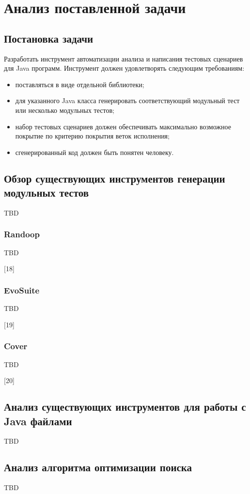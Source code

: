 \chapter{Анализ поставленной задачи} 

\section{Постановка задачи}

Разработать инструмент автоматизации анализа и написания тестовых сценариев для Java программ. Инструмент должен удовлетворять следующим требованиям:

\begin{itemize}
	\item поставляться в виде отдельной библиотеки;
	\item для указанного Java класса генерировать соответствующий модульный тест или несколько модульных тестов;
	\item набор тестовых сценариев должен обеспечивать максимально возможное покрытие по критерию покрытия веток исполнения;
	\item сгенерированный код должен быть понятен человеку.
\end{itemize}


\section{Обзор существующих инструментов генерации модульных тестов}

TBD

\subsection{Randoop}

TBD 

[18]

\subsection{EvoSuite}

TBD 

[19]

\subsection{Cover}

TBD

[20]


\section{Анализ существующих инструментов для работы с Java файлами}

TBD

\section{Анализ алгоритма оптимизации поиска}

TBD
